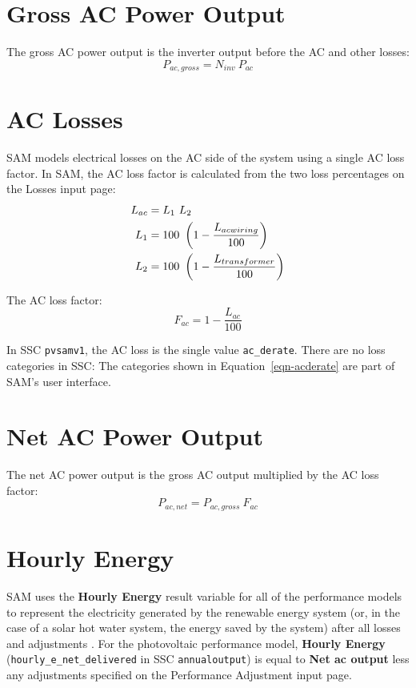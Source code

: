 \documentclass[12pt,letterpaper]{article}
\begin{document}
\section{Gross AC Power Output}

The gross AC power output is the inverter output before the AC and other losses:
\begin{equation}
P_{ac,gross}= N_{inv}~P_{ac}
\end{equation}

\section{AC Losses}\label{sec-aclosses}

SAM models electrical losses on the AC side of the system using a single AC loss factor.  In SAM, the AC loss factor is calculated from the two loss percentages on the Losses input page:
\begin{align}\label{eqn-acderate}
L_{ac} &= L_1~L_2\notag\\
L_{1} &= 100~\left(1-\frac{L_{acwiring}}{100}\right) \notag\\
L_{2} &= 100~\left(1-\frac{L_{transformer}}{100}\right)
\end{align}

The AC loss factor:
\begin{equation}
F_{ac}=1-\frac{L_{ac}}{100}
\end{equation}

In SSC \texttt{pvsamv1}, the AC loss is the single value \texttt{ac\_derate}. There are no loss categories in SSC: The categories shown in Equation~\ref{eqn-acderate} are part of SAM's user interface.

\section{Net AC Power Output}\label{sec-netacoutput}

The net AC power output is the gross AC output multiplied by the AC loss factor:
\begin{equation}
P_{ac,net}= P_{ac,gross}~F_{ac}
\end{equation}

\section{Hourly Energy} \label{sec-hourlyenergy}

SAM uses the \textbf{Hourly Energy} result variable for all of the performance models to represent the electricity generated by the renewable energy system (or, in the case of a solar hot water system, the energy saved by the system) after all losses and adjustments \citep{help-hourlyenergy}. For the photovoltaic performance model, \textbf{Hourly Energy} (\texttt{hourly\_e\_net\_delivered} in SSC \texttt{annualoutput}) is equal to \textbf{Net ac output} less any adjustments specified on the Performance Adjustment input page. 
\end{document}
